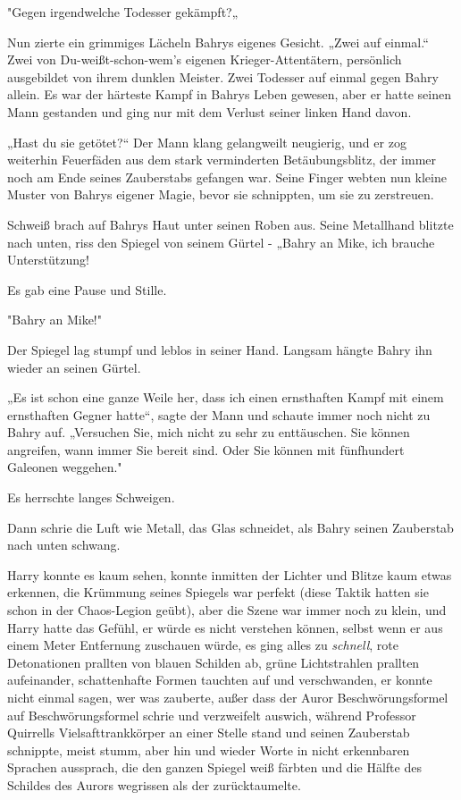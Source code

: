 {"Gegen irgendwelche Todesser gekämpft?„

Nun zierte ein grimmiges Lächeln Bahrys eigenes Gesicht. „Zwei auf einmal.“ Zwei von Du-weißt-schon-wem's eigenen Krieger-Attentätern, persönlich ausgebildet von ihrem dunklen Meister. Zwei Todesser auf einmal gegen Bahry allein. Es war der härteste Kampf in Bahrys Leben gewesen, aber er hatte seinen Mann gestanden und ging nur mit dem Verlust seiner linken Hand davon.

„Hast du sie getötet?“ Der Mann klang gelangweilt neugierig, und er zog weiterhin Feuerfäden aus dem stark verminderten Betäubungsblitz, der immer noch am Ende seines Zauberstabs gefangen war. Seine Finger webten nun kleine Muster von Bahrys eigener Magie, bevor sie schnippten, um sie zu zerstreuen.

Schweiß brach auf Bahrys Haut unter seinen Roben aus. Seine Metallhand blitzte nach unten, riss den Spiegel von seinem Gürtel - „Bahry an Mike, ich brauche Unterstützung!

Es gab eine Pause und Stille.

"Bahry an Mike!"

Der Spiegel lag stumpf und leblos in seiner Hand. Langsam hängte Bahry ihn wieder an seinen Gürtel.

„Es ist schon eine ganze Weile her, dass ich einen ernsthaften Kampf mit einem ernsthaften Gegner hatte“, sagte der Mann und schaute immer noch nicht zu Bahry auf. „Versuchen Sie, mich nicht zu sehr zu enttäuschen. Sie können angreifen, wann immer Sie bereit sind. Oder Sie können mit fünfhundert Galeonen weggehen."

Es herrschte langes Schweigen.

Dann schrie die Luft wie Metall, das Glas schneidet, als Bahry seinen Zauberstab nach unten schwang.

Harry konnte es kaum sehen, konnte inmitten der Lichter und Blitze kaum etwas erkennen, die Krümmung seines Spiegels war perfekt (diese Taktik hatten sie schon in der Chaos-Legion geübt), aber die Szene war immer noch zu klein, und Harry hatte das Gefühl, er würde es nicht verstehen können, selbst wenn er aus einem Meter Entfernung zuschauen würde, es ging alles zu \emph{schnell}, rote Detonationen prallten von blauen Schilden ab, grüne Lichtstrahlen prallten aufeinander, schattenhafte Formen tauchten auf und verschwanden, er konnte nicht einmal sagen, wer was zauberte, außer dass der Auror Beschwörungsformel auf Beschwörungsformel schrie und verzweifelt auswich, während Professor Quirrells Vielsafttrankkörper an einer Stelle stand und seinen Zauberstab schnippte, meist stumm, aber hin und wieder Worte in nicht erkennbaren Sprachen aussprach, die den ganzen Spiegel weiß färbten und die Hälfte des Schildes des Aurors wegrissen als der zurücktaumelte.

}
